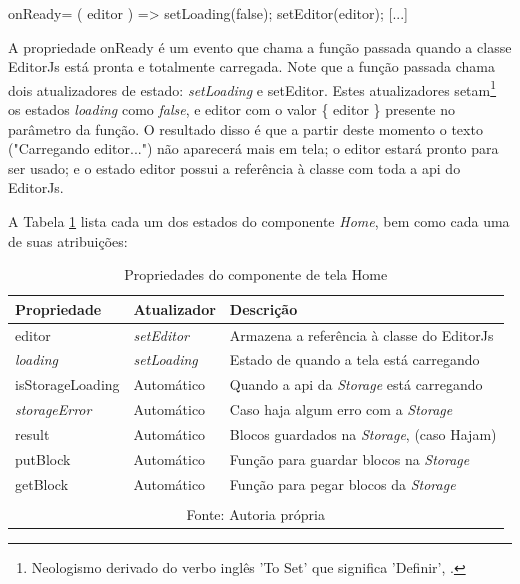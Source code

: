 \begin{Codec2804faf5d544873a3fa906d0644d313}
[...]
onReady={ ({ editor }) => {
    setLoading(false);
    setEditor(editor);
} }
[...]
\end{Codec2804faf5d544873a3fa906d0644d313}

A propriedade onReady é um evento que chama
a função passada quando a classe EditorJs está pronta e
totalmente carregada. Note que a função passada chama dois
atualizadores de estado: \textit{setLoading} e setEditor. Estes atualizadores
setam\footnote{Neologismo derivado do verbo inglês 'To Set' que significa 'Definir',
    \cite{setar}.
}
os estados \textit{loading} como \textit{false}, e editor com o valor \{ editor \} presente
no parâmetro da função. O resultado disso é que a partir deste momento
o texto ("Carregando editor...") não aparecerá mais em tela; o editor
estará pronto para ser usado; e o estado editor possui a referência
à classe com toda a
\acrshort{api}
do EditorJs.

A
            Tabela \ref{tbl:props-componente-home}
            lista cada um dos estados do componente \textit{Home}, bem como cada uma de suas
            atribuições:

\begin{table}[H]
    \centering
    \caption{Propriedades do componente de tela Home}
    \label{tbl:props-componente-home}
    \renewcommand{\arraystretch}{1.5}
    \begin{tabular}{p{3.5200cm} p{2.8800cm} p{9.6000cm}}
        \hline
        \textbf{Propriedade} & \textbf{Atualizador} & \textbf{Descrição} \\
        \hline
        editor & \textit{setEditor} & Armazena a referência à classe do EditorJs \\
		\textit{loading} & \textit{setLoading} & Estado de quando a tela está carregando \\
		isStorageLoading & Automático & Quando a \acrshort{api}                    da \textit{Storage} está carregando \\
		\textit{storageError} & Automático & Caso haja algum erro com a \textit{Storage} \\
		result & Automático & Blocos guardados na \textit{Storage}, (caso Hajam) \\
		putBlock & Automático & Função para guardar blocos na \textit{Storage} \\
		getBlock & Automático & Função para pegar blocos da \textit{Storage} \\
        \hline
        \\\multicolumn{3}{c}{\fontsize{10pt}{12pt}Fonte: Autoria própria}
    \end{tabular}
\end{table}

